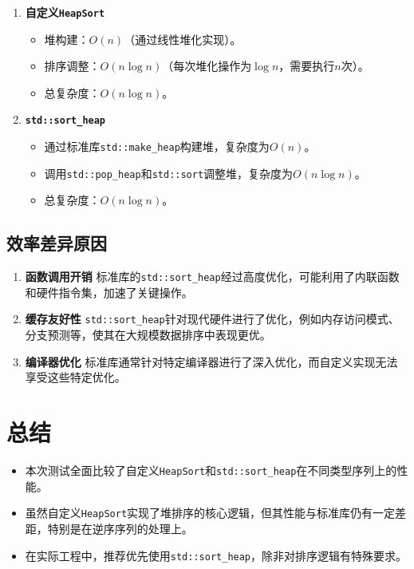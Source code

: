\documentclass{ctexart}
\begin{document}
\begin{enumerate}
    \item \textbf{自定义\texttt{HeapSort}}
    \begin{itemize}
        \item 堆构建：$O(n)$（通过线性堆化实现）。
        \item 排序调整：$O(n \log n)$（每次堆化操作为$\log n$，需要执行$n$次）。
        \item 总复杂度：$O(n \log n)$。
    \end{itemize}

    \item \textbf{\texttt{std::sort\_heap}}
    \begin{itemize}
        \item 通过标准库\texttt{std::make\_heap}构建堆，复杂度为$O(n)$。
        \item 调用\texttt{std::pop\_heap}和\texttt{std::sort}调整堆，复杂度为$O(n \log n)$。
        \item 总复杂度：$O(n \log n)$。
    \end{itemize}
\end{enumerate}

\subsection{效率差异原因}

\begin{enumerate}
    \item \textbf{函数调用开销}  
    标准库的\texttt{std::sort\_heap}经过高度优化，可能利用了内联函数和硬件指令集，加速了关键操作。

    \item \textbf{缓存友好性}  
    \texttt{std::sort\_heap}针对现代硬件进行了优化，例如内存访问模式、分支预测等，使其在大规模数据排序中表现更优。

    \item \textbf{编译器优化}  
    标准库通常针对特定编译器进行了深入优化，而自定义实现无法享受这些特定优化。
\end{enumerate}

\section{总结}

\begin{itemize}
    \item 本次测试全面比较了自定义\texttt{HeapSort}和\texttt{std::sort\_heap}在不同类型序列上的性能。
    \item 虽然自定义\texttt{HeapSort}实现了堆排序的核心逻辑，但其性能与标准库仍有一定差距，特别是在逆序序列的处理上。
    \item 在实际工程中，推荐优先使用\texttt{std::sort\_heap}，除非对排序逻辑有特殊要求。
\end{itemize}
\end{document}
